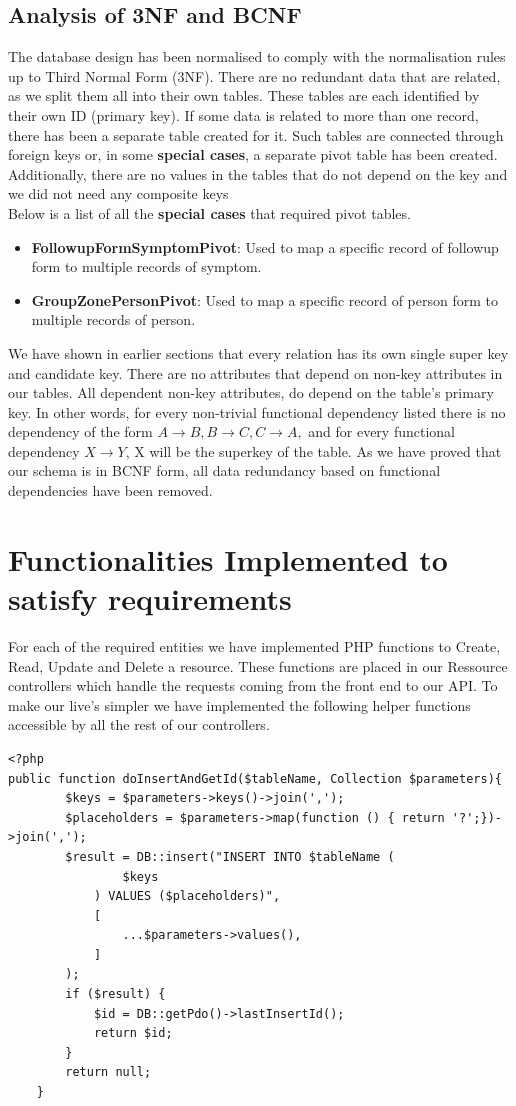 \documentclass{article}
\begin{document}
\subsection{Analysis of 3NF and BCNF}
The database design has been normalised to comply with the normalisation rules up to Third Normal Form (3NF). There are no redundant data that are related, as we split them all into their own tables. These tables are each identified by their own ID (primary key). 
If some data is related to more than one record, there has been a separate table created for it. Such tables are connected through foreign keys or, in some \textbf{special cases}, a separate pivot table has been created. Additionally, there are no values in the tables that do not depend on the key and we did not need any composite keys\\
Below is a list of all the \textbf{special cases} that required pivot tables.
\begin{itemize}
    \item \textbf{FollowupFormSymptomPivot}: Used to map a specific record of followup form to multiple records of symptom.
    \item \textbf{GroupZonePersonPivot}: Used to map a specific record of person form to multiple records of person.
\end{itemize}
We have shown in earlier sections that every relation has its own single super key and candidate key. 
There are no attributes that depend on non-key attributes in our tables. All dependent non-key attributes, do depend on the table's primary key. In other words, for every non-trivial functional dependency listed there is no dependency of the form $A\rightarrow B, B \rightarrow C, C \rightarrow A,$ and for every functional dependency $X\rightarrow Y$, X will be the superkey of the table.
As we have proved that our schema is in BCNF form, all data redundancy based on functional dependencies have been removed.

\newpage
\section{Functionalities Implemented to satisfy requirements}
For each of the required entities we have implemented PHP functions to Create, Read, Update and Delete a resource. These functions are placed in our Ressource controllers which handle the requests coming from the front end to our API. To make our live's simpler we have implemented the following helper functions accessible by all the rest of our controllers.
\begin{verbatim}
<?php
public function doInsertAndGetId($tableName, Collection $parameters){
        $keys = $parameters->keys()->join(',');
        $placeholders = $parameters->map(function () { return '?';})->join(',');
        $result = DB::insert("INSERT INTO $tableName (
                $keys
            ) VALUES ($placeholders)",
            [
                ...$parameters->values(),
            ]
        );
        if ($result) {
            $id = DB::getPdo()->lastInsertId();
            return $id;
        }
        return null;
    }
    
\end{verbatim}
\end{document}
